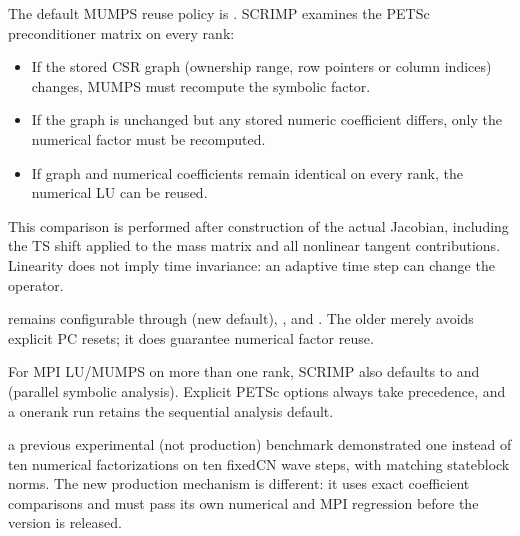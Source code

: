 \documentclass[letterpaper,10pt,english]{sphinxmanual}
\begin{document}
\sphinxAtStartPar
The default MUMPS reuse policy is . SCRIMP examines the
 PETSc preconditioner matrix on every rank:
\begin{itemize}
\item {} 
\sphinxAtStartPar
If the stored CSR graph (ownership range, row pointers or column
indices) changes, MUMPS must recompute the symbolic factor.

\item {} 
\sphinxAtStartPar
If the graph is unchanged but any stored numeric coefficient differs,
only the numerical factor must be recomputed.

\item {} 
\sphinxAtStartPar
If graph and numerical coefficients remain identical on every rank,
the numerical LU can be reused.

\end{itemize}

\sphinxAtStartPar
This comparison is performed after construction of the actual Jacobian,
including the TS shift applied to the mass matrix and all nonlinear
tangent contributions. Linearity does not imply time invariance: an
adaptive time step can change the operator.

\sphinxAtStartPar
{} remains configurable through
 (new default), , and . The older
 merely avoids explicit PC resets; it does  guarantee
numerical factor reuse.

\sphinxAtStartPar
For MPI LU/MUMPS on more than one rank, SCRIMP also defaults to
 and  (parallel symbolic analysis).
Explicit PETSc options always take precedence, and a one\sphinxhyphen{}rank run
retains the sequential analysis default.

\sphinxAtStartPar
{} a previous experimental (not production)
 benchmark demonstrated one instead of ten numerical
factorizations on ten fixed\sphinxhyphen{}CN wave steps, with matching state\sphinxhyphen{}block
norms. The new production  mechanism is different:
it uses exact coefficient comparisons and must pass its own numerical
and MPI regression before the version is released.
\end{document}

